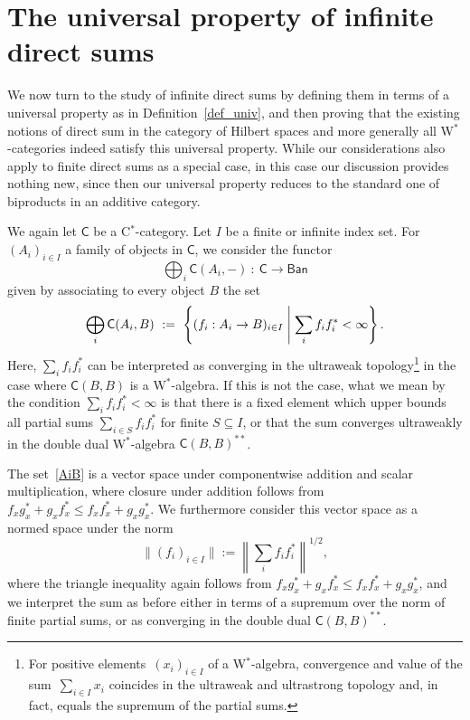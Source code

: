 \documentclass[reqno,T1,11pt]{amsproc}
\newcommand{\beq}{\begin{equation}}
\newcommand{\eeq}{\end{equation}}
\newcommand{\cat}[1]{\mathsf{#1}}		%
\newcommand{\Ban}{\mathsf{Ban}}			%
\theoremstyle{plain}
\theoremstyle{remark}
\numberwithin{equation}{section}
\begin{document}
\section{The universal property of infinite direct sums}
\label{sec_directsum_def}

We now turn to the study of infinite direct sums by defining them in terms of a universal property as in Definition~\ref{def_univ}, and then proving that the existing notions of direct sum in the category of Hilbert spaces and more generally all W$^*$-categories indeed satisfy this universal property. While our considerations also apply to finite direct sums as a special case, in this case our discussion provides nothing new, since then our universal property reduces to the standard one of biproducts in an additive category.

We again let $\cat{C}$ be a C$^*$-category. Let $I$ be a finite or infinite index set. For $(A_i)_{i\in I}$ a family of objects in $\cat{C}$, we consider the functor
\[
	\bigoplus_i \cat{C}(A_i,-) \: : \: \cat{C} \to \Ban
\]
given by associating to every object $B$ the set
\beq
\label{AiB}
	\bigoplus_i \cat{C}(A_i , B) \ := \ \left\{ (f_i : A_i \to B)_{i\in I} \Biggm\vert \sum_i f_i f_i^* < \infty \right\}.
\eeq
Here, $\sum_i f_i f_i^*$ can be interpreted as converging in the ultraweak topology\footnote{For positive elements~$(x_i)_{i \in I}$ of a W$^*$-algebra, convergence and value of the sum~$\sum_{i \in I} x_i$ coincides in the ultraweak and ultrastrong topology and, in fact, equals the supremum of the partial sums.} in the case where $\cat{C}(B,B)$ is a W$^*$-algebra. If this is not the case, what we mean by the condition $\sum_i f_i f_i^* < \infty$ is that there is a fixed element which upper bounds all partial sums $\sum_{i\in S} f_i f_i^*$ for finite $S\subseteq I$, or that the sum converges ultraweakly in the double dual W$^*$-algebra $\cat{C}(B,B)^{**}$.

The set~\eqref{AiB} is a vector space under componentwise addition and scalar multiplication, where closure under addition follows from $f_x g^*_x + g_x f^*_x \leq f_x f^*_x + g_x g^*_x$. We furthermore consider this vector space as a normed space under the norm
\[
	\| (f_i)_{i \in I} \| := \left\| \sum_i f_i f_i^* \right\|^{1/2},
\]
where the triangle inequality again follows from $f_x g^*_x + g_x f^*_x \leq f_x f^*_x + g_x g^*_x$, and we interpret the sum as before either in terms of a supremum over the norm of finite partial sums, or as converging in the double dual $\cat{C}(B,B)^{**}$.
\end{document}
